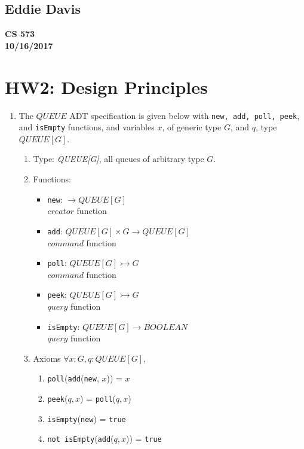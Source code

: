\documentclass{report}
\begin{document}
\subsection*{Eddie Davis}
\textbf{CS 573}\\
\textbf{10/16/2017}\\

\section*{HW2: Design Principles}

\begin{enumerate}
	\item The $QUEUE$ ADT specification is given below with \texttt{new, add, poll, peek}, and \texttt{isEmpty} functions, and
	variables $x$, of generic type $G$, and $q$, type $QUEUE[G]$.
	
	\begin{enumerate}
		\item Type: \textit{QUEUE[G]}, all queues of arbitrary type $G$.
		\item Functions:
		\begin{itemize}
			\item \texttt{new}: $\rightarrow QUEUE[G]$ \\
			$creator$ function
			\item \texttt{add}: $QUEUE[G] \times G \rightarrow QUEUE[G]$ \\
			$command$ function
			\item \texttt{poll}: $QUEUE[G] \rightarrowtail G$ \\
			$command$ function			
			\item \texttt{peek}: $QUEUE[G] \rightarrowtail G$ \\
    		$query$ function
			\item \texttt{isEmpty}: $QUEUE[G] \rightarrow BOOLEAN$ \\
    		$query$ function			
		\end{itemize}
		
		\item Axioms		
		$\forall x:G, q:QUEUE[G]$,
			\begin{enumerate}
				\item \texttt{poll}(\texttt{add}(\texttt{new}, $x$)) = $x$
				\item \texttt{peek}($q, x$) = \texttt{poll}($q, x$)
				\item \texttt{isEmpty}(\texttt{new}) = \texttt{true}
				\item \texttt{not isEmpty}(\texttt{add}($q, x$)) = \texttt{true}
        	\end{enumerate}		


\end{enumerate}
\end{enumerate}
\end{document}
